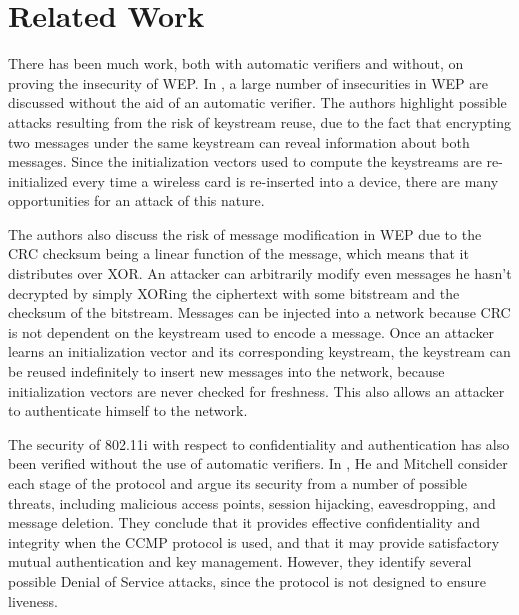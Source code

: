 \documentclass[11pt, twocolumn]{article} %
\begin{document}
\section{Related Work}
\label{sec:Related Work}
There has been much work, both with automatic verifiers and without, on proving the insecurity of WEP.  In \cite{borisov01}, a large number of insecurities in WEP are discussed without the aid of an automatic verifier.  The authors highlight possible attacks resulting from the risk of keystream reuse, due to the fact that encrypting two messages under the same keystream can reveal information about both messages.  Since the initialization vectors used to compute the keystreams are re-initialized every time a wireless card is re-inserted into a device, there are many opportunities for an attack of this nature.  

The authors also discuss the risk of message modification in WEP due to the CRC checksum being a linear function of the message, which means that it distributes over XOR.  An attacker can arbitrarily modify even messages he hasn't decrypted by simply XORing the ciphertext with some bitstream and the checksum of the bitstream.  Messages can be injected into a network because CRC is not dependent on the keystream used to encode a message. Once an attacker learns an initialization vector and its corresponding keystream, the keystream can be reused indefinitely to insert new messages into the network, because initialization vectors are never checked for freshness.  This also allows an attacker to authenticate himself to the network.  

The security of 802.11i with respect to confidentiality and authentication has also been verified without the use of automatic verifiers.  In \cite{he05}, He and Mitchell consider each stage of the protocol and argue its security from a number of possible threats, including malicious access points, session hijacking, eavesdropping, and message deletion.  They conclude that it provides effective confidentiality and integrity when the CCMP protocol is used, and that it may provide satisfactory mutual authentication and key management.  However, they identify several possible Denial of Service attacks, since the protocol is not designed to ensure liveness.
\end{document}

